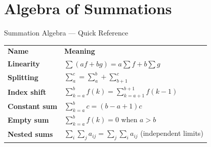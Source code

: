 \section{Algebra of Summations}

\begin{toolkitbox}{Summation Algebra --- Quick Reference}
\renewcommand{\arraystretch}{1.5}
\begin{tabular}{@{}ll@{}}
\textbf{Name} & \textbf{Meaning} \\
\textbf{Linearity} & $\sum(af+bg) = a\sum f + b\sum g$ \\
\textbf{Splitting} & $\sum_a^c = \sum_a^b + \sum_{b+1}^c$ \\
\textbf{Index shift} & $\sum_{k=a}^{b} f(k) = \sum_{k=a+1}^{b+1} f(k-1)$ \\
\textbf{Constant sum} & $\sum_{k=a}^{b} c = (b-a+1)c$ \\
\textbf{Empty sum} & $\sum_{k=a}^{b} f(k) = 0$ when $a > b$ \\
\textbf{Nested sums} & $\sum_i\sum_j a_{ij} = \sum_j\sum_i a_{ij}$ (independent limits) \\
\end{tabular}
\end{toolkitbox}


